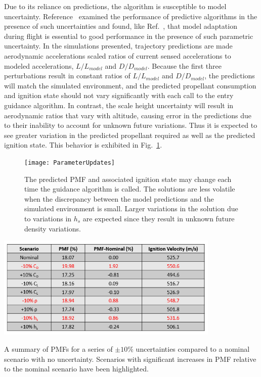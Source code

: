 \documentclass[letterpaper, paper,11pt]{AAS}
\begin{document}
Due to its reliance on predictions, the algorithm is susceptible to model uncertainty. Reference~\cite{predictor_corrector_analysis} examined the performance of predictive algorithms in the presence of such uncertainties and found, like Ref.~\cite{lu2014entry}, that model adaptation during flight is essential to good performance in the presence of such parametric uncertainty. In the simulations presented, trajectory predictions are made aerodynamic accelerations scaled ratios of current sensed accelerations to modeled accelerations, $L/L_{model}$ and $ D/D_{model} $. Because the first three perturbations result in constant ratios of $L/L_{model}$ and $ D/D_{model} $, the predictions will match the simulated environment, and the predicted propellant consumption and ignition state should not vary significantly with each call to the entry guidance algorithm. In contrast, the scale height uncertainty will result in aerodynamic ratios that vary with altitude, causing error in the predictions due to their inability to account for unknown future variations. Thus it is expected to see greater variation in the predicted propellant required as well as the predicted ignition state. This behavior is exhibited in Fig.~\ref{fig_parametric_updates}.
\begin{figure}[h!]
	\centering
	\texttt{[image: ParameterUpdates]} 
	\caption{The predicted PMF and associated ignition state may change each time the guidance algorithm is called. The solutions are less volatile when the discrepancy between the model predictions and the simulated environment is small. Larger variations in the solution due to variations in $h_s$ are expected since they result in unknown future density variations.}
	\label{fig_parametric_updates}
\end{figure}
\begin{table}[h!]
	\centering
	\includegraphics[width=0.8\textwidth]{ParametricSensitivityTable} 
	\caption{A summary of PMFs for a series of $\pm10\%$ uncertainties compared to a nominal scenario with no uncertainty. Scenarios with significant increases in PMF relative to the nominal scenario have been highlighted.}
	\label{table_parametric}
\end{table}
\end{document}
